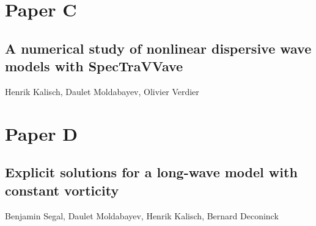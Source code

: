 
\chapter*{Paper C}
\section*{A numerical study of nonlinear dispersive wave models with SpecTraVVave}

\noindent Henrik Kalisch, Daulet Moldabayev, Olivier Verdier\\

\cleardoublepage




\chapter*{Paper D}
\section*{Explicit solutions for a long-wave model with constant vorticity}

\noindent Benjamin Segal, Daulet Moldabayev, Henrik Kalisch, Bernard Deconinck\\

\cleardoublepage

